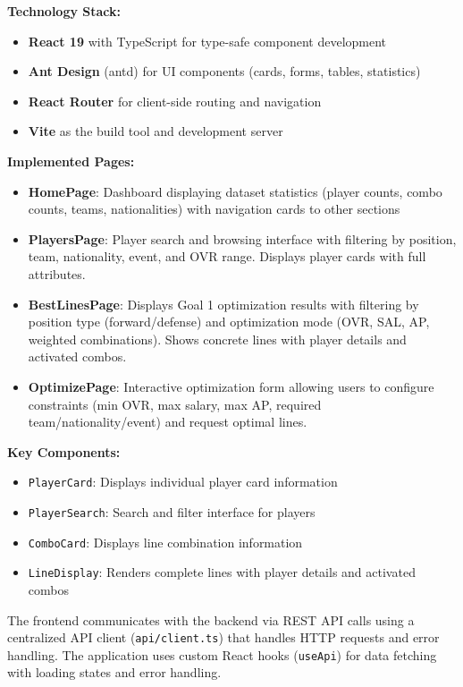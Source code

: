 \textbf{Technology Stack:}
\begin{itemize}
    \item \textbf{React 19} with TypeScript for type-safe component development
    \item \textbf{Ant Design} (antd) for UI components (cards, forms, tables, statistics)
    \item \textbf{React Router} for client-side routing and navigation
    \item \textbf{Vite} as the build tool and development server
\end{itemize}

\textbf{Implemented Pages:}
\begin{itemize}
    \item \textbf{HomePage}: Dashboard displaying dataset statistics (player counts, combo counts, teams, nationalities) with navigation cards to other sections
    \item \textbf{PlayersPage}: Player search and browsing interface with filtering by position, team, nationality, event, and OVR range. Displays player cards with full attributes.
    \item \textbf{BestLinesPage}: Displays Goal 1 optimization results with filtering by position type (forward/defense) and optimization mode (OVR, SAL, AP, weighted combinations). Shows concrete lines with player details and activated combos.
    \item \textbf{OptimizePage}: Interactive optimization form allowing users to configure constraints (min OVR, max salary, max AP, required team/nationality/event) and request optimal lines.
\end{itemize}

\textbf{Key Components:}
\begin{itemize}
    \item \texttt{PlayerCard}: Displays individual player card information
    \item \texttt{PlayerSearch}: Search and filter interface for players
    \item \texttt{ComboCard}: Displays line combination information
    \item \texttt{LineDisplay}: Renders complete lines with player details and activated combos
\end{itemize}

The frontend communicates with the backend via REST API calls using a centralized API client (\texttt{api/client.ts}) that handles HTTP requests and error handling. The application uses custom React hooks (\texttt{useApi}) for data fetching with loading states and error handling.

